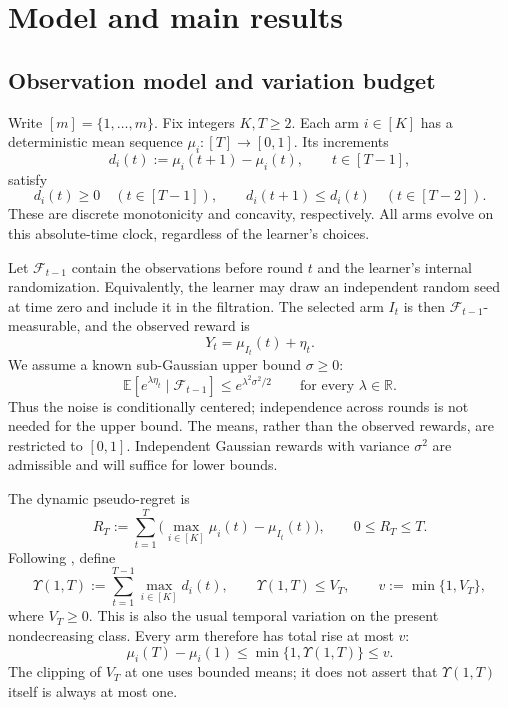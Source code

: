 \documentclass[11pt]{article}
\theoremstyle{remark}
\newcommand{\E}{\mathbb E}
\newcommand{\R}{\mathbb R}
\newcommand{\cF}{\mathcal F}
\begin{document}
\section{Model and main results}\label{sec:model}

\subsection{Observation model and variation budget}

Write $[m]=\{1,\ldots,m\}$. Fix integers $K,T\ge2$. Each arm $i\in[K]$ has a deterministic mean sequence $\mu_i:[T]\to[0,1]$. Its increments
\[
d_i(t):=\mu_i(t+1)-\mu_i(t),\qquad t\in[T-1],
\]
satisfy
\begin{equation}\label{eq:shape-main}
d_i(t)\ge0\quad(t\in[T-1]),\qquad
d_i(t+1)\le d_i(t)\quad(t\in[T-2]).
\end{equation}
These are discrete monotonicity and concavity, respectively. All arms evolve on this absolute-time clock, regardless of the learner's choices.

Let $\cF_{t-1}$ contain the observations before round $t$ and the learner's internal randomization. Equivalently, the learner may draw an independent random seed at time zero and include it in the filtration. The selected arm $I_t$ is then $\cF_{t-1}$-measurable, and the observed reward is
\begin{equation}\label{eq:observation-main}
Y_t=\mu_{I_t}(t)+\eta_t.
\end{equation}
We assume a known sub-Gaussian upper bound $\sigma\ge0$:
\begin{equation}\label{eq:subg-main}
\E\!\left[e^{\lambda\eta_t}\mid\cF_{t-1}\right]
\le e^{\lambda^2\sigma^2/2}
\qquad\text{for every }\lambda\in\R.
\end{equation}
Thus the noise is conditionally centered; independence across rounds is not needed for the upper bound. The means, rather than the observed rewards, are restricted to $[0,1]$. Independent Gaussian rewards with variance $\sigma^2$ are admissible and will suffice for lower bounds.

The dynamic pseudo-regret is
\begin{equation}\label{eq:regret-main}
R_T:=\sum_{t=1}^T\bigl(\max_{i\in[K]}\mu_i(t)-\mu_{I_t}(t)\bigr),
\qquad 0\le R_T\le T.
\end{equation}
Following \citet{migali2025tightening}, define
\begin{equation}\label{eq:variation-main}
\Upsilon(1,T):=\sum_{t=1}^{T-1}\max_{i\in[K]}d_i(t),
\qquad \Upsilon(1,T)\le V_T,
\qquad v:=\min\{1,V_T\},
\end{equation}
where $V_T\ge0$. This is also the usual temporal variation on the present nondecreasing class. Every arm therefore has total rise at most $v$:
\begin{equation}\label{eq:perarm-rise-main}
\mu_i(T)-\mu_i(1)\le\min\{1,\Upsilon(1,T)\}\le v.
\end{equation}
The clipping of $V_T$ at one uses bounded means; it does not assert that $\Upsilon(1,T)$ itself is always at most one.
\end{document}
